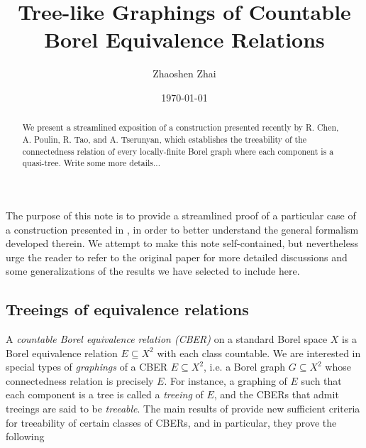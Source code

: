 \documentclass[reqno]{amsart}
\begin{document}
    \title{Tree-like Graphings of Countable Borel Equivalence Relations}
    \author{Zhaoshen Zhai}
    \address{Department of Mathematics and Statistics, McGill University, 805 Sherbrooke Street West, Montreal, QC, H3A 0B9, Canada}
    \date{\today}

    \begin{abstract}
        We present a streamlined exposition of a construction presented recently by R. Chen, A. Poulin, R. Tao, and A. Tserunyan, which establishes the treeability of the connectedness relation of every locally-finite Borel graph where each component is a quasi-tree. {\color{red}Write some more details...}
    \end{abstract}

    \maketitle


    The purpose of this note is to provide a streamlined proof of a particular case of a construction presented in \cite{CPTT23}, in order to better understand the general formalism developed therein. We attempt to make this note self-contained, but nevertheless urge the reader to refer to the original paper for more detailed discussions and some generalizations of the results we have selected to include here.

    \subsection*{Treeings of equivalence relations}

    A \textit{countable Borel equivalence relation (CBER)} on a standard Borel space $X$ is a Borel equivalence relation $E\subseteq X^2$ with each class countable. We are interested in special types of \textit{graphings} of a CBER $E\subseteq X^2$, i.e. a Borel graph $G\subseteq X^2$ whose connectedness relation is precisely $E$. For instance, a graphing of $E$ such that each component is a tree is called a \textit{treeing} of $E$, and the CBERs that admit treeings are said to be \textit{treeable}. The main results of \cite{CPTT23} provide new sufficient criteria for treeability of certain classes of CBERs, and in particular, they prove the following
\end{document}

